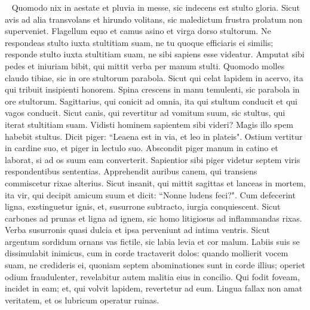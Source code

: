 \begin{biblechapter}   
\verse Quomodo nix in aestate et pluvia in messe, sic indecens est stulto gloria. 
\verse Sicut avis ad alia transvolans et hirundo volitans, sic maledictum frustra prolatum non superveniet. 
\verse Flagellum equo et camus asino et virga dorso stultorum. 
\verse Ne respondeas stulto iuxta stultitiam suam, ne tu quoque efficiaris ei similis; 
\verse responde stulto iuxta stultitiam suam, ne sibi sapiens esse videatur. 
\verse Amputat sibi pedes et iniuriam bibit, qui mittit verba per manum stulti. 
\verse Quomodo molles claudo tibiae, sic in ore stultorum parabola. 
\verse Sicut qui celat lapidem in acervo, ita qui tribuit insipienti honorem. 
\verse Spina crescens in manu temulenti, sic parabola in ore stultorum. 
\verse Sagittarius, qui conicit ad omnia, ita qui stultum conducit et qui vagos conducit. 
\verse Sicut canis, qui revertitur ad vomitum suum, sic stultus, qui iterat stultitiam suam. 
\verse Vidisti hominem sapientem sibi videri? Magis illo spem habebit stultus. 
\verse Dicit piger: “Leaena est in via, et leo in plateis". 
\verse Ostium vertitur in cardine suo, et piger in lectulo suo. 
\verse Abscondit piger manum in catino et laborat, si ad os suum eam converterit. 
\verse Sapientior sibi piger videtur septem viris respondentibus sententias. 
\verse Apprehendit auribus canem, qui transiens commiscetur rixae alterius. 
\verse Sicut insanit, qui mittit sagittas et lanceas in mortem, 
\verse ita vir, qui decipit amicum suum et dicit: “Nonne ludens feci?". 
\verse Cum defecerint ligna, exstinguetur ignis, et, susurrone subtracto, iurgia conquiescent. 
\verse Sicut carbones ad prunas et ligna ad ignem, sic homo litigiosus ad inflammandas rixas. 
\verse Verba susurronis quasi dulcia et ipsa perveniunt ad intima ventris. 
\verse Sicut argentum sordidum ornans vas fictile, sic labia levia et cor malum. 
\verse Labiis suis se dissimulabit inimicus, cum in corde tractaverit dolos: 
\verse quando mollierit vocem suam, ne credideris ei, quoniam septem abominationes sunt in corde illius; 
\verse operiet odium fraudulenter, revelabitur autem malitia eius in concilio. 
\verse Qui fodit foveam, incidet in eam; et, qui volvit lapidem, revertetur ad eum. 
\verse Lingua fallax non amat veritatem, et os lubricum operatur ruinas. 
\end{biblechapter}

